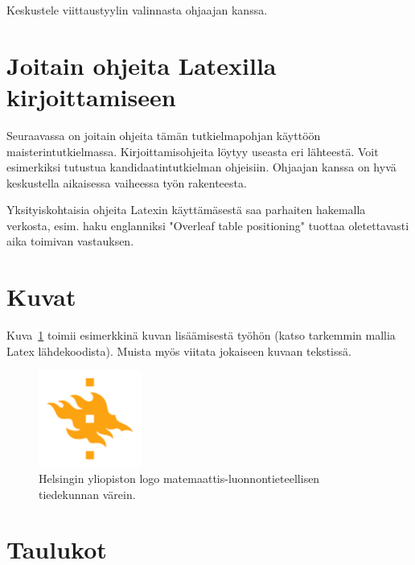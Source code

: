 Keskustele viittaustyylin valinnasta ohjaajan kanssa. 

\section{Joitain ohjeita Latexilla kirjoittamiseen}

Seuraavassa on joitain ohjeita tämän tutkielmapohjan käyttöön maisterintutkielmassa. Kirjoittamisohjeita löytyy useasta eri lähteestä. Voit esimerkiksi tutustua kandidaatintutkielman ohjeisiin. 
Ohjaajan kanssa on hyvä keskustella aikaisessa vaiheessa työn rakenteesta.

Yksityiskohtaisia ohjeita Latexin käyttämäsestä saa parhaiten hakemalla verkosta, esim. haku englanniksi "Overleaf table positioning" tuottaa oletettavasti aika toimivan vastauksen.

\section{Kuvat}
Kuva~\ref{fig:logo-fi} toimii esimerkkinä kuvan lisäämisestä työhön (katso tarkemmin mallia Latex lähdekoodista). Muista myös viitata jokaiseen kuvaan tekstissä. 

\begin{figure}[ht] %
\centering 
\includegraphics[width=0.3\textwidth]{template/figures/HY-logo-ml.png}
\caption{Helsingin yliopiston logo matemaattis-luonnontieteellisen tiedekunnan värein.\label{fig:logo-fi}}
\end{figure}

\newpage %
\section{Taulukot}

